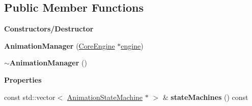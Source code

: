 \subsection*{Public Member Functions}
\begin{Indent}\textbf{ Constructors/\+Destructor}\par
\begin{DoxyCompactItemize}
\item 
\mbox{\label{classrev_1_1_animation_manager_a0cb0042aa327c355d64b2fef321408fd}} 
{\bfseries Animation\+Manager} (\mbox{\hyperlink{classrev_1_1_core_engine}{Core\+Engine}} $\ast$\mbox{\hyperlink{classrev_1_1_manager_a0fbd0df6b4f3caf42b557f9702f48171}{engine}})
\item 
\mbox{\label{classrev_1_1_animation_manager_ad11b0b35ef03f67f6bdde06b3fb6a3c1}} 
{\bfseries $\sim$\+Animation\+Manager} ()
\end{DoxyCompactItemize}
\end{Indent}
\begin{Indent}\textbf{ Properties}\par
\begin{DoxyCompactItemize}
\item 
\mbox{\label{classrev_1_1_animation_manager_a78d6e30b45c3c71967a46ea9c93cb7ae}} 
const std\+::vector$<$ \mbox{\hyperlink{classrev_1_1_animation_state_machine}{Animation\+State\+Machine}} $\ast$ $>$ \& {\bfseries state\+Machines} () const
\end{DoxyCompactItemize}
\end{Indent}
